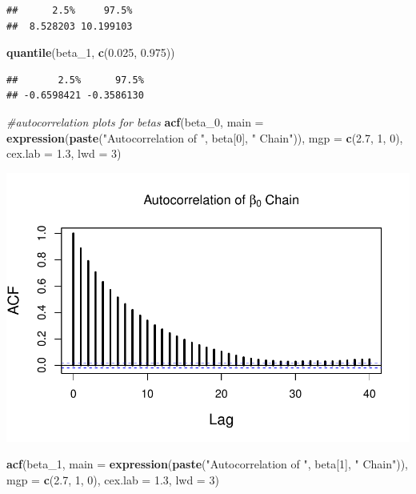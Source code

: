 \documentclass[
]{article}
\newenvironment{Shaded}{\begin{snugshade}}{\end{snugshade}}
\newcommand{\AttributeTok}[1]{\textcolor[rgb]{0.13,0.29,0.53}{#1}}
\newcommand{\CommentTok}[1]{\textcolor[rgb]{0.56,0.35,0.01}{\textit{#1}}}
\newcommand{\DecValTok}[1]{\textcolor[rgb]{0.00,0.00,0.81}{#1}}
\newcommand{\FloatTok}[1]{\textcolor[rgb]{0.00,0.00,0.81}{#1}}
\newcommand{\FunctionTok}[1]{\textcolor[rgb]{0.13,0.29,0.53}{\textbf{#1}}}
\newcommand{\NormalTok}[1]{#1}
\newcommand{\StringTok}[1]{\textcolor[rgb]{0.31,0.60,0.02}{#1}}
\begin{document}
\begin{verbatim}
##      2.5%     97.5% 
##  8.528203 10.199103
\end{verbatim}

\begin{Shaded}
\begin{Highlighting}[]
\FunctionTok{quantile}\NormalTok{(beta\_1, }\FunctionTok{c}\NormalTok{(}\FloatTok{0.025}\NormalTok{, }\FloatTok{0.975}\NormalTok{))}
\end{Highlighting}
\end{Shaded}

\begin{verbatim}
##       2.5%      97.5% 
## -0.6598421 -0.3586130
\end{verbatim}

\begin{Shaded}
\begin{Highlighting}[]
\CommentTok{\#autocorrelation plots for betas}
\FunctionTok{acf}\NormalTok{(beta\_0, }\AttributeTok{main =} \FunctionTok{expression}\NormalTok{(}\FunctionTok{paste}\NormalTok{(}\StringTok{"Autocorrelation of "}\NormalTok{, beta[}\DecValTok{0}\NormalTok{], }\StringTok{" Chain"}\NormalTok{)), }\AttributeTok{mgp =} \FunctionTok{c}\NormalTok{(}\FloatTok{2.7}\NormalTok{, }\DecValTok{1}\NormalTok{, }\DecValTok{0}\NormalTok{), }\AttributeTok{cex.lab =} \FloatTok{1.3}\NormalTok{, }\AttributeTok{lwd =} \DecValTok{3}\NormalTok{)}
\end{Highlighting}
\end{Shaded}

\includegraphics{Homework_6_files/figure-latex/prob4b-5.pdf}

\begin{Shaded}
\begin{Highlighting}[]
\FunctionTok{acf}\NormalTok{(beta\_1, }\AttributeTok{main =} \FunctionTok{expression}\NormalTok{(}\FunctionTok{paste}\NormalTok{(}\StringTok{"Autocorrelation of "}\NormalTok{, beta[}\DecValTok{1}\NormalTok{], }\StringTok{" Chain"}\NormalTok{)), }\AttributeTok{mgp =} \FunctionTok{c}\NormalTok{(}\FloatTok{2.7}\NormalTok{, }\DecValTok{1}\NormalTok{, }\DecValTok{0}\NormalTok{), }\AttributeTok{cex.lab =} \FloatTok{1.3}\NormalTok{, }\AttributeTok{lwd =} \DecValTok{3}\NormalTok{)}
\end{Highlighting}
\end{Shaded}
\end{document}
